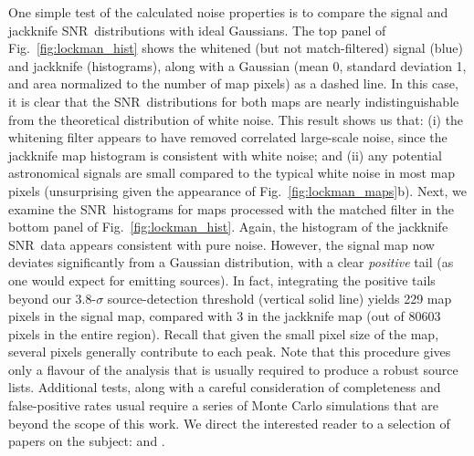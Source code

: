 \documentclass[useAMS,usenatbib,nofootinbib]{mn2e}
\newcommand{\snr}{SNR}
\begin{document}
One simple test of the calculated noise properties is to compare the
signal and jackknife \snr\ distributions with ideal Gaussians. The top
panel of Fig.~\ref{fig:lockman_hist} shows the whitened (but not
match-filtered) signal (blue) and jackknife (histograms), along with a
Gaussian (mean 0, standard deviation 1, and area normalized to the
number of map pixels) as a dashed line. In this case, it is clear that
the \snr\ distributions for both maps are nearly indistinguishable
from the theoretical distribution of white noise. This result shows us
that: (i) the whitening filter appears to have removed correlated
large-scale noise, since the jackknife map histogram is consistent
with white noise; and (ii) any potential astronomical signals are
small compared to the typical white noise in most map pixels
(unsurprising given the appearance of
Fig.~\ref{fig:lockman_maps}b). Next, we examine the \snr\ histograms
for maps processed with the matched filter in the bottom panel of
Fig.~\ref{fig:lockman_hist}. Again, the histogram of the jackknife
\snr\ data appears consistent with pure noise. However, the signal map
now deviates significantly from a Gaussian distribution, with a clear
\emph{positive} tail (as one would expect for emitting sources). In
fact, integrating the positive tails beyond our 3.8-$\sigma$
source-detection threshold (vertical solid line) yields 229 map pixels
in the signal map, compared with 3 in the jackknife map (out of 80603
pixels in the entire region). Recall that given the small pixel size
of the map, several pixels generally contribute to each peak. Note
that this procedure gives only a flavour of the analysis that is
usually required to produce a robust source lists. Additional tests,
along with a careful consideration of completeness and false-positive
rates usual require a series of Monte Carlo simulations that are
beyond the scope of this work. We direct the interested reader to a
selection of papers on the subject:
\citet{scott2002,coppin2006,perera2008,2009ApJ...707.1201W} and
\citet{chapin2011}.
\end{document}
